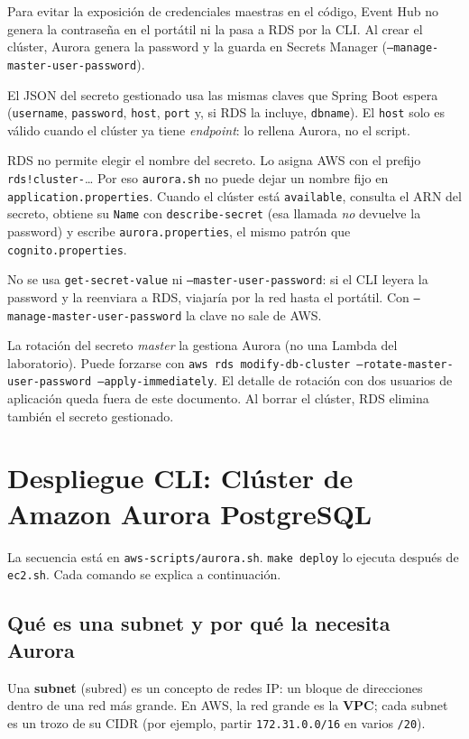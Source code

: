 \documentclass[12pt,a4paper]{article}
\begin{document}
Para evitar la exposición de credenciales maestras en el código, Event Hub no genera la contraseña en el portátil ni la pasa a RDS por la CLI. Al crear el clúster, Aurora genera la password y la guarda en Secrets Manager (\texttt{--manage-master-user-password}).

El JSON del secreto gestionado usa las mismas claves que Spring Boot espera (\texttt{username}, \texttt{password}, \texttt{host}, \texttt{port} y, si RDS la incluye, \texttt{dbname}). El \texttt{host} solo es válido cuando el clúster ya tiene \textit{endpoint}: lo rellena Aurora, no el script.

RDS no permite elegir el nombre del secreto. Lo asigna AWS con el prefijo \texttt{rds!cluster-}\ldots{} Por eso \texttt{aurora.sh} no puede dejar un nombre fijo en \texttt{application.properties}. Cuando el clúster está \texttt{available}, consulta el ARN del secreto, obtiene su \texttt{Name} con \texttt{describe-secret} (esa llamada \emph{no} devuelve la password) y escribe \texttt{aurora.properties}, el mismo patrón que \texttt{cognito.properties}.

No se usa \texttt{get-secret-value} ni \texttt{--master-user-password}: si el CLI leyera la password y la reenviara a RDS, viajaría por la red hasta el portátil. Con \texttt{--manage-master-user-password} la clave no sale de AWS.

La rotación del secreto \textit{master} la gestiona Aurora (no una Lambda del laboratorio). Puede forzarse con \texttt{aws rds modify-db-cluster --rotate-master-user-password --apply-immediately}. El detalle de rotación con dos usuarios de aplicación queda fuera de este documento. Al borrar el clúster, RDS elimina también el secreto gestionado.

\section{Despliegue CLI: Clúster de Amazon Aurora PostgreSQL}

La secuencia está en \texttt{aws-scripts/aurora.sh}. \texttt{make deploy} lo ejecuta después de \texttt{ec2.sh}. Cada comando se explica a continuación.

\subsection{Qué es una subnet y por qué la necesita Aurora}

Una \textbf{subnet} (subred) es un concepto de redes IP: un bloque de direcciones dentro de una red más grande. En AWS, la red grande es la \textbf{VPC}; cada subnet es un trozo de su CIDR (por ejemplo, partir \texttt{172.31.0.0/16} en varios \texttt{/20}).
\end{document}
